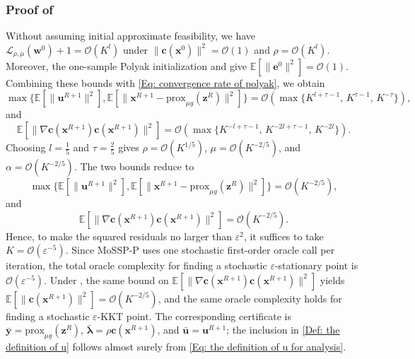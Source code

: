 \documentclass{article}
\theoremstyle{plain}
\theoremstyle{definition}
\theoremstyle{remark}
\newcommand{\EE}{\mathbb{E}}
\newcommand{\prox}{\mathrm{prox}}
\newcommand{\bx}{\bm{x}}
\newcommand{\bc}{\bm{c}}
\newcommand{\be}{\bm{e}}
\newcommand{\bu}{\bm{u}}
\newcommand{\bz}{\bm{z}}
\newcommand{\by}{\bm{y}}
\newcommand{\calL}{\mathcal{L}}
\newcommand{\calO}{\mathcal{O}}
\newcommand{\bw}{\bm{w}}
\newcommand{\blambda}{\bm{\lambda}}
\numberwithin{equation}{section}
\begin{document}
\subsubsection{Proof of }
\label{app:polyak_without_initial_feasibility}
Without assuming initial approximate feasibility, we have $\calL_{\rho,\mu}(\bw^0)+1=\calO(K^l)$ under $\|\bc(\bx^0)\|^2=\calO(1)$ and $\rho=\calO(K^l)$. Moreover, the one-sample Polyak initialization and  give $\EE[\|\be^0\|^2]=\calO(1)$. Combining these bounds with \eqref{Eq: convergence rate of polyak}, we obtain
\[
\max\bigl\{\EE[\|\bu^{R+1}\|^2],
\EE[\|\bx^{R+1}-\prox_{\mu g}(\bz^R)\|^2]\bigr\}
=
\calO\!\left(\max\{K^{l+\tau-1},\,K^{\tau-1},\,K^{-\tau}\}\right),
\]
and
\[
\EE[\|\nabla\bc(\bx^{R+1})\bc(\bx^{R+1})\|^2]
=
\calO\!\left(\max\{K^{-l+\tau-1},\,K^{-2l+\tau-1},\,K^{-2l}\}\right).
\]
Choosing $l=\tfrac{1}{5}$ and $\tau=\tfrac{2}{5}$ gives $\rho=\calO(K^{1/5})$, $\mu=\calO(K^{-2/5})$, and $\alpha=\calO(K^{-2/5})$. The two bounds reduce to
\[
\max\bigl\{\EE[\|\bu^{R+1}\|^2],
\EE[\|\bx^{R+1}-\prox_{\mu g}(\bz^R)\|^2]\bigr\}
=\calO(K^{-2/5}),
\]
and
\[
\EE[\|\nabla\bc(\bx^{R+1})\bc(\bx^{R+1})\|^2]
=\calO(K^{-2/5}).
\]
Hence, to make the squared residuals no larger than $\varepsilon^2$, it suffices to take $K=\calO(\varepsilon^{-5})$. Since MoSSP-P uses one stochastic first-order oracle call per iteration, the total oracle complexity for finding a stochastic $\varepsilon$-stationary point is $\calO(\varepsilon^{-5})$. Under , the same bound on $\EE[\|\nabla\bc(\bx^{R+1})\bc(\bx^{R+1})\|^2]$ yields $\EE[\|\bc(\bx^{R+1})\|^2]=\calO(K^{-2/5})$, and the same oracle complexity holds for finding a stochastic $\varepsilon$-KKT point. The corresponding certificate is $\bar{\by}=\prox_{\mu g}(\bz^R)$, $\bar{\blambda}=\rho\bc(\bx^{R+1})$, and $\bar{\bu}=\bu^{R+1}$; the inclusion in \eqref{Def: the definition of u} follows almost surely from \eqref{Eq: the definition of u for analysis}.
\end{document}
